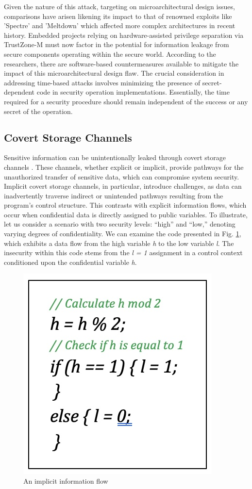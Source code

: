 Given the nature of this attack, targeting on microarchitectural design issues, comparisons have arisen likening its impact to that of renowned exploits like 'Spectre' and 'Meltdown' which affected more complex architectures in recent history. Embedded projects relying on hardware-assisted privilege separation via TrustZone-M must now factor in the potential for information leakage from secure components operating within the secure world. According to the researchers, there are software-based countermeasures available to mitigate the impact of this microarchitectural design flaw. The crucial consideration in addressing time-based attacks involves minimizing the presence of secret-dependent code in security operation implementations. Essentially, the time required for a security procedure should remain independent of the success or any secret of the operation.

\subsection{Covert Storage Channels}

Sensitive information can be unintentionally leaked through covert storage channels \cite{storagechannel, sabelfeld}. These channels, whether explicit or implicit, provide pathways for the unauthorized transfer of sensitive data, which can compromise system security. Implicit covert storage channels, in particular, introduce challenges, as data can inadvertently traverse indirect or unintended pathways resulting from the program's control structure. This contrasts with explicit information flows, which occur when confidential data is directly assigned to public variables. To illustrate, let us consider a scenario with two security levels: ``high'' and ``low,'' denoting varying degrees of confidentiality. We can examine the code presented in Fig. \ref{fig:implicit}, which exhibits a data flow from the high variable \textit{h} to the low variable \textit{l}. The insecurity within this code stems from the \textit{l = 1} assignment in a control context conditioned upon the confidential variable \textit{h}.

 \begin{figure}
  \centering
  \medskip
  \includegraphics[width=.3\textwidth]{figures/implicit.jpg}
  \caption[Short caption for Table of Figures]{An implicit information flow}
  \label{fig:implicit}
\end{figure}

